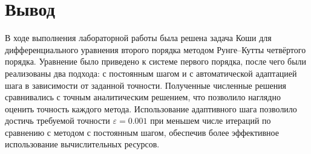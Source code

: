\documentclass[a4paper, 14pt]{extarticle}
\begin{document}
\section{Вывод}
В ходе выполнения лабораторной работы была решена задача Коши для дифференциального уравнения второго порядка методом 
Рунге–Кутты четвёртого порядка. Уравнение было приведено к системе первого порядка, после чего были реализованы 
два подхода: с постоянным шагом и с автоматической адаптацией шага в зависимости от заданной точности. 
Полученные численные решения сравнивались с точным аналитическим решением, что позволило наглядно оценить 
точность каждого метода. Использование адаптивного шага позволило достичь требуемой точности $\varepsilon = 0.001$ 
при меньшем числе итераций по сравнению с методом с постоянным шагом, обеспечив более эффективное использование 
вычислительных ресурсов.
\end{document}
